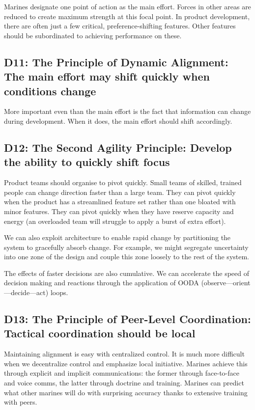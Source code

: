 \documentclass{article}
\begin{document}
\begin{multicols}{2}
Marines designate one point of action as the main effort. Forces in other areas are reduced to create maximum strength at this focal point. In product development, there are often just a few critical, preference-shifting features. Other features should be subordinated to achieving performance on these.

\subsection{D11: The Principle of Dynamic Alignment: The main effort may shift quickly when conditions change}

More important even than the main effort is the fact that information can change during development. When it does, the main effort should shift accordingly.

\subsection{D12: The Second Agility Principle: Develop the ability to quickly shift focus}

Product teams should organise to pivot quickly. Small teams of skilled, trained people can change direction faster than a large team. They can pivot quickly when the product has a streamlined feature set rather than one bloated with minor features. They can pivot quickly when they have reserve capacity and energy (an overloaded team will struggle to apply a burst of extra effort).

We can also exploit architecture to enable rapid change by partitioning the system to gracefully absorb change. For example, we might segregate uncertainty into one zone of the design and couple this zone loosely to the rest of the system.

The effects of faster decisions are also cumulative. We can accelerate the speed of decision making and reactions through the application of OODA (observe---orient---decide---act) loops.

\subsection{D13: The Principle of Peer-Level Coordination: Tactical coordination should be local}

Maintaining alignment is easy with centralized control. It is much more difficult when we decentralize control and emphasize local initiative. Marines achieve this through explicit and implicit communications: the former through face-to-face and voice comms, the latter through doctrine and training. Marines can predict what other marines will do with surprising accuracy thanks to extensive training with peers.


\end{multicols}
\end{document}
